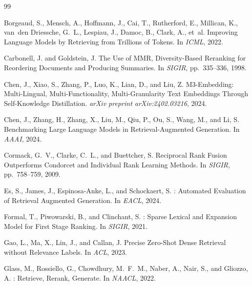 \documentclass[11pt]{article}
\begin{document}

\begin{thebibliography}{99}

Borgeaud, S., Mensch, A., Hoffmann, J., Cai, T., Rutherford, E., Millican, K.,
  van~den Driessche, G.~L., Lespiau, J., Damoc, B., Clark, A., et~al.
\newblock Improving Language Models by Retrieving from Trillions of Tokens.
\newblock In \emph{ICML}, 2022.

Carbonell, J. and Goldstein, J.
\newblock The Use of {MMR}, Diversity-Based Reranking for Reordering Documents and
  Producing Summaries.
\newblock In \emph{SIGIR}, pp.\ 335--336, 1998.

Chen, J., Xiao, S., Zhang, P., Luo, K., Lian, D., and Liu, Z.
 {M3-Embedding}: Multi-Lingual, Multi-Functionality,
  Multi-Granularity Text Embeddings Through Self-Knowledge Distillation.
\newblock \emph{arXiv preprint arXiv:2402.03216}, 2024.

Chen, J., Zhang, H., Zhang, X., Liu, M., Qiu, P., Ou, S., Wang, M., and
  Li, S.
\newblock Benchmarking Large Language Models in Retrieval-Augmented Generation.
\newblock In \emph{AAAI}, 2024.

Cormack, G.~V., Clarke, C.~L., and Buettcher, S.
\newblock Reciprocal Rank Fusion Outperforms {Condorcet} and Individual Rank Learning
  Methods.
\newblock In \emph{SIGIR}, pp.\ 758--759, 2009.

Es, S., James, J., Espinosa-Anke, L., and Schockaert, S.
: Automated Evaluation of Retrieval Augmented Generation.
\newblock In \emph{EACL}, 2024.

Formal, T., Piwowarski, B., and Clinchant, S.
: Sparse Lexical and Expansion Model for First Stage Ranking.
\newblock In \emph{SIGIR}, 2021.

Gao, L., Ma, X., Lin, J., and Callan, J.
\newblock Precise Zero-Shot Dense Retrieval without Relevance Labels.
\newblock In \emph{ACL}, 2023.

Glass, M., Rossiello, G., Chowdhury, M.~F.~M., Naber, A., Nair, S., and Gliozzo, A.
: Retrieve, Rerank, Generate.
\newblock In \emph{NAACL}, 2022.


\end{thebibliography}
\end{document}
